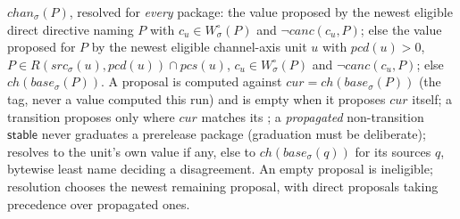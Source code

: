\begin{definition}[channels]
\label{def:chan}
$\mathit{chan}_\sigma(P)$, resolved for \emph{every} package: the value
proposed by the newest eligible direct  directive naming $P$ with
$c_u \in W^\circ_\sigma(P)$ and $\lnot\mathit{canc}(c_u,P)$; else the value proposed for $P$ by the newest eligible
channel-axis unit $u$ with $\mathit{pcd}(u) > 0$, $P \in
R(\mathit{src}_\sigma(u), \mathit{pcd}(u)) \cap \mathit{pcs}(u)$,
$c_u \in W^\circ_\sigma(P)$ and $\lnot\mathit{canc}(c_u,P)$; else
$\mathit{ch}(\mathit{base}_\sigma(P))$. A proposal is computed against
$\mathit{cur} = \mathit{ch}(\mathit{base}_\sigma(P))$ (the tag, never
a value computed this run) and is empty when it proposes
$\mathit{cur}$ itself; a transition proposes only where $\mathit{cur}$
matches its ; a \emph{propagated} non-transition
$\mathsf{stable}$ never graduates a prerelease package (graduation must
be deliberate);  resolves to the unit's own
 value if any, else to
$\mathit{ch}(\mathit{base}_\sigma(q))$ for its sources $q$, bytewise
least name deciding a disagreement.
An empty proposal is ineligible; resolution chooses the newest remaining
proposal, with direct proposals taking precedence over propagated ones.
\end{definition}

